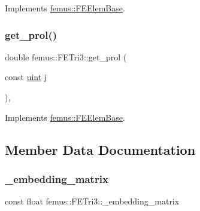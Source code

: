 Implements \mbox{\hyperlink{classfemus_1_1_f_e_elem_base_a0c4d6d5ec66bd4e301eb8ea2ef10f354}{femus\+::\+F\+E\+Elem\+Base}}.

\mbox{\label{classfemus_1_1_f_e_tri3_aa7d2dc636ad0e4b18782beac8bd927ef}} 
\subsubsection{\texorpdfstring{get\+\_\+prol()}{get\_prol()}}
{\footnotesize\ttfamily double femus\+::\+F\+E\+Tri3\+::get\+\_\+prol (\begin{DoxyParamCaption}\item[{const \mbox{\hyperlink{_typedefs_8hpp_a91ad9478d81a7aaf2593e8d9c3d06a14}{uint}}}]{j }\end{DoxyParamCaption})\hspace{0.3cm}{\ttfamily [inline]}, {\ttfamily [virtual]}}



Implements \mbox{\hyperlink{classfemus_1_1_f_e_elem_base_ac82326cdc7cb02329c7be9547d56fad4}{femus\+::\+F\+E\+Elem\+Base}}.



\subsection{Member Data Documentation}
\mbox{\label{classfemus_1_1_f_e_tri3_a1fc74a520e21afe5e54e380a5a880734}} 
\subsubsection{\texorpdfstring{\+\_\+embedding\+\_\+matrix}{\_embedding\_matrix}}
{\footnotesize\ttfamily const float femus\+::\+F\+E\+Tri3\+::\+\_\+embedding\+\_\+matrix\hspace{0.3cm}{\ttfamily [static]}}

